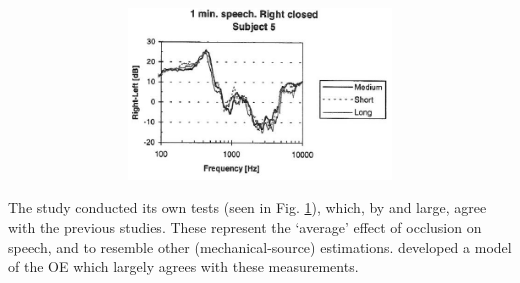 \begin{figure}
\begin{subfigure}{0.5\textwidth}
\begin{subfigure}{0.8\textwidth}
  \end{subfigure}
  \begin{subfigure}{0.8\textwidth}
    \centering
    \includegraphics[width=1\textwidth]{figure/Hansen_OE-plot_b.png}
  \end{subfigure}
  \caption{}
  \label{fig:hansenAverageOEb}
\end{subfigure}
\caption{}
\label{fig:hansenAverageOE}
\end{figure}
\DIFaddend The study conducted its own tests (seen in Fig. \ref{fig:hansenAverageOEb}), which, by and large, agree with the previous studies.  
These represent the `average' effect of occlusion on speech, and \DIFdelbegin {}\DIFdelend \DIFaddbegin {}\DIFaddend to resemble other (mechanical-source) estimations.  \cite{hansen:97b} developed a model of the OE which largely agrees with these measurements.

